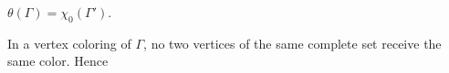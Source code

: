 $\theta(\Gamma) = \chi_0(\Gamma')$.

In a vertex coloring of $\Gamma$, no two vertices of the same complete set receive the same color. Hence
